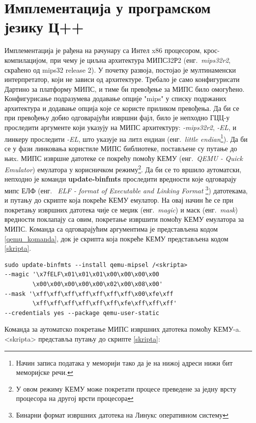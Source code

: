 \documentclass[12pt,oneside]{memoir}
\begin{document}
\section{Имплементација у програмском језику Ц++}
Имплементација је рађена на рачунару са Интел x86 процесором, крос-компилацијом, при чему је циљна архитектура  МИПС32Р2 (енг.~\textit{mips32r2}, скраћено од mips32 release 2). У почетку развоја, постојао је мултинаменски интерпретатор, који не зависи од архитектуре. Требало је само конфигурисати Дартино за платформу МИПС, и тиме би превођење за МИПС било омогућено. Конфигурисање подразумева додавање опције "mips" у списку подржаних архитектура и додавање опција које се користе приликом превођења. Да би се при превођењу добио одговарајући извршни фајл, било је непходно ГЦЦ-у проследити аргументе који указују на МИПС архитектуру: \textit{-mips32r2}, \textit{-EL}, и линкеру проследити \textit{-EL}, што указује на литл ендиан (енг.~\textit{little endian}\footnote{Начин записа података у меморији тако да је на нижој адреси нижи бит меморијске речи.}). Да би се у фази линковања користиле МИПС библиотеке, постављене су путање до њиx. 
МИПС извршне датотеке се покрећу помоћу КЕМУ (енг.~\textit{QEMU - Quick Emulator}) емулатора у корисничком режиму\footnote{У овом режиму КЕМУ може покретати процесе преведене за једну врсту процесора на другој врсти процесора}. Да би се то вршило аутоматски, непходно је команди \textbf{update-binfmts} проследити вредности које одговарају мипс ЕЛФ (енг.~\textit{ ELF - format of Executable and Linking Format} \footnote{Бинарни формат извршних датотека на Линукс оперативном систему}) датотекама, и путању до скрипте која покреће КЕМУ емулатор. На овај начин ће се при покретању извршних датотека чије се меџик (енг.~\textit{magic}) и маск (енг.~\textit{mask}) вредности поклапају са овим, покретање извршити помоћу КЕМУ емулатора за МИПС. Команда са одговарајућим аргументима је представљена кодом \ref{qemu_komanda}, док је скрипта која покреће КЕМУ представљена кодом \ref{skripta}. \\

\begin{listing}
\centering
\begin{verbatim}
sudo update-binfmts --install qemu-mipsel /<skripta>
--magic '\x7fELF\x01\x01\x01\x00\x00\x00\x00
        \x00\x00\x00\x00\x00\x02\x00\x08\x00'
--mask '\xff\xff\xff\xff\xff\xff\xff\x00\xfe\xff
        \xff\xff\xff\xff\xff\xff\xfe\xff\xff\xff'
--credentials yes --package qemu-user-static
\end{verbatim}
\caption{Команда за аутоматско покретање МИПС извршних датотека помоћу КЕМУ-a. <skripta> представља путању до скрипте \ref{skripta}:}
\label{qemu_komanda}
\end{listing}
\end{document}

